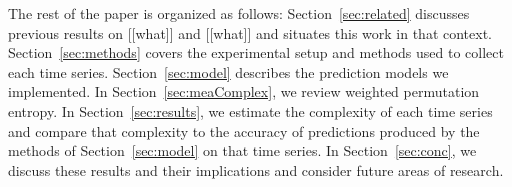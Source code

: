 

The rest of the paper is organized as follows:
Section~\ref{sec:related} discusses previous results on [[what]] and
[[what]] and situates this work in that
context. Section~\ref{sec:methods} covers the experimental setup and
methods used to collect each time series. Section~\ref{sec:model}
describes the prediction models we implemented.  In
Section~\ref{sec:meaComplex}, we review weighted permutation entropy.
In Section~\ref{sec:results}, we estimate the complexity of each time
series and compare that complexity to the accuracy of predictions
produced by the methods of Section~\ref{sec:model} on that time
series.  In Section~\ref{sec:conc}, we discuss these results and their
implications and consider future areas of research.

